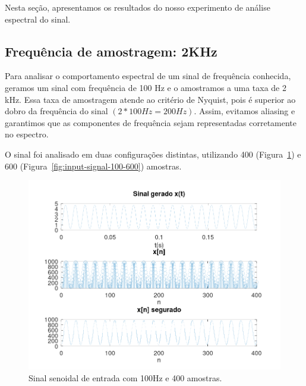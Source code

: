 Nesta seção, apresentamos os resultados do nosso experimento de análise espectral do sinal.

\subsection{Frequência de amostragem: 2KHz}
Para analisar o comportamento espectral de um sinal de frequência conhecida, geramos um sinal com frequência de 100 Hz e o amostramos a uma taxa de 2 kHz. Essa taxa de amostragem atende ao critério de Nyquist, pois é superior ao dobro da frequência do sinal $(2 * 100 Hz = 200 Hz)$. Assim, evitamos aliasing e garantimos que as componentes de frequência sejam representadas corretamente no espectro.

O sinal foi analisado em duas configurações distintas, utilizando 400 (Figura~\ref{fig:input-signal-100-400}) e 600 (Figura~\ref{fig:input-signal-100-600}) amostras.

\begin{figure}[H]
    \centering
    \includegraphics[width=1\linewidth]{03_results/assets/sin__100Hz_fs2k_SIGNAL_400smp}
    \caption{Sinal senoidal de entrada com 100Hz e 400 amostras.}
    \label{fig:input-signal-100-400}
\end{figure}

